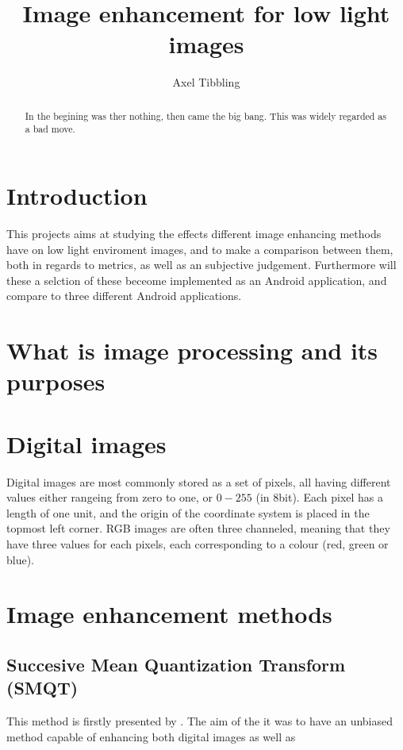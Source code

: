 \documentclass{IEEEtran}
\title{Image enhancement for low light images}
\author{Axel Tibbling}
\begin{document}
\maketitle

\begin{abstract}
In the begining was ther nothing, then came the big bang. This was widely regarded as a bad move.
\end{abstract}

\section{Introduction}

This projects aims at studying the effects different image enhancing methods have on low light enviroment images, and to make a comparison between them, both in regards to metrics, as well as an subjective judgement. Furthermore will these a selction of these beceome implemented as an Android application, and compare to three different Android applications.

\section{What is image processing and its purposes}

\section{Digital images}

Digital images are most commonly stored as a set of pixels, all having different values either rangeing from zero to one, or $0-255$ (in 8bit). Each pixel has a length of one unit, and the origin of the coordinate system is placed in the topmost left corner. RGB images are often three channeled, meaning that they have three values for each pixels, each corresponding to a colour (red, green or blue).

\section{Image enhancement methods}

\subsection{Succesive Mean Quantization Transform (SMQT)}

This method is firstly presented by \cite{smqt_2008}. The aim of the it was to have an unbiased method capable of enhancing both digital images as well as
\end{document}
